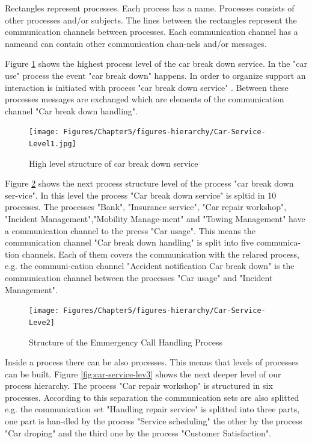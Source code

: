 Rectangles represent processes. Each process has a name. Processes consists of other processes and/or subjects. The lines between the rectangles represent the communication channels between processes. Each communication channel has a nameand can contain other communication chan-nels and/or messages.

Figure \ref{fig:car-service-level1} shows the highest process level of the car break down service. In the "car use" process the event "car break down" happens. In order to organize support an interaction is initiated with process "car break down service" . Between these processes messages are exchanged which are elements of the communication channel "Car break down handling".\\


\begin{figure}[htbp]
	\centering
	\texttt{[image: Figures/Chapter5/figures-hierarchy/Car-Service-Level1.jpg]}
	\caption[High level structure of car break down service]{High level structure of car break down service}
	\label{fig:car-service-level1}
\end{figure}



Figure \ref{fig:car-service-leve2} shows the next process structure level of the process "car break down ser-vice". In this level the process "Car break down service" is spltid in 10 processes. The processes "Bank", "Insurance service", "Car repair workshop", "Incident Management","Mobility Manage-ment" and "Towing Management" have a communication channel to the prcess "Car usage". This means the communication channel "Car break down handling" is split into five communica-tion channels. Each of them covers the communication with the relared process, e.g. the communi-cation channel "Accident notification Car break down" is the communication channel between the processes "Car usage" and "Incident Management".\\


\begin{figure}[htbp]
	\centering
	\texttt{[image: Figures/Chapter5/figures-hierarchy/Car-Service-Leve2]}
	\caption[Structure of the Emmergency Call Handling Process]{Structure of the Emmergency Call Handling Process}
	\label{fig:car-service-leve2}
\end{figure}



Inside a process there can be also processes. This means that levels of processes can be built. Figure \ref{fig:car-service-lev3} shows the next deeper level of our process hierarchy. The process "Car repair workshop" is structured in six processes. According to this separation the communication sets are also splitted e.g. the communication set "Handling repair service" is splitted into three parts, one part is han-dled by the process "Service scheduling" the other by the process "Car droping" and the third one by the process "Customer Satisfaction".\\

